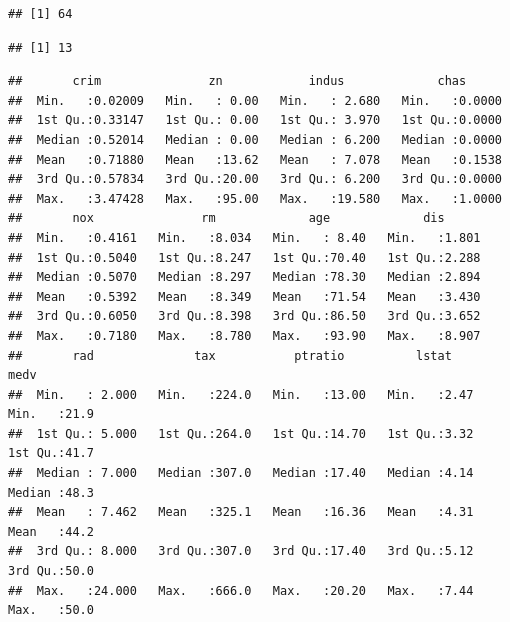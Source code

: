 \documentclass[
  11pt,
]{article}
\newenvironment{Shaded}{\begin{snugshade}}{\end{snugshade}}
\newcommand{\DecValTok}[1]{\textcolor[rgb]{0.00,0.00,0.81}{#1}}
\newcommand{\FunctionTok}[1]{\textcolor[rgb]{0.13,0.29,0.53}{\textbf{#1}}}
\newcommand{\NormalTok}[1]{#1}
\newcommand{\SpecialCharTok}[1]{\textcolor[rgb]{0.81,0.36,0.00}{\textbf{#1}}}
\begin{document}
\begin{Shaded}
\end{Shaded}

\begin{verbatim}
## [1] 64
\end{verbatim}

\begin{Shaded}
\end{Shaded}

\begin{verbatim}
## [1] 13
\end{verbatim}

\begin{Shaded}
\end{Shaded}

\begin{verbatim}
##       crim               zn            indus             chas       
##  Min.   :0.02009   Min.   : 0.00   Min.   : 2.680   Min.   :0.0000  
##  1st Qu.:0.33147   1st Qu.: 0.00   1st Qu.: 3.970   1st Qu.:0.0000  
##  Median :0.52014   Median : 0.00   Median : 6.200   Median :0.0000  
##  Mean   :0.71880   Mean   :13.62   Mean   : 7.078   Mean   :0.1538  
##  3rd Qu.:0.57834   3rd Qu.:20.00   3rd Qu.: 6.200   3rd Qu.:0.0000  
##  Max.   :3.47428   Max.   :95.00   Max.   :19.580   Max.   :1.0000  
##       nox               rm             age             dis       
##  Min.   :0.4161   Min.   :8.034   Min.   : 8.40   Min.   :1.801  
##  1st Qu.:0.5040   1st Qu.:8.247   1st Qu.:70.40   1st Qu.:2.288  
##  Median :0.5070   Median :8.297   Median :78.30   Median :2.894  
##  Mean   :0.5392   Mean   :8.349   Mean   :71.54   Mean   :3.430  
##  3rd Qu.:0.6050   3rd Qu.:8.398   3rd Qu.:86.50   3rd Qu.:3.652  
##  Max.   :0.7180   Max.   :8.780   Max.   :93.90   Max.   :8.907  
##       rad              tax           ptratio          lstat           medv     
##  Min.   : 2.000   Min.   :224.0   Min.   :13.00   Min.   :2.47   Min.   :21.9  
##  1st Qu.: 5.000   1st Qu.:264.0   1st Qu.:14.70   1st Qu.:3.32   1st Qu.:41.7  
##  Median : 7.000   Median :307.0   Median :17.40   Median :4.14   Median :48.3  
##  Mean   : 7.462   Mean   :325.1   Mean   :16.36   Mean   :4.31   Mean   :44.2  
##  3rd Qu.: 8.000   3rd Qu.:307.0   3rd Qu.:17.40   3rd Qu.:5.12   3rd Qu.:50.0  
##  Max.   :24.000   Max.   :666.0   Max.   :20.20   Max.   :7.44   Max.   :50.0
\end{verbatim}
\end{document}
